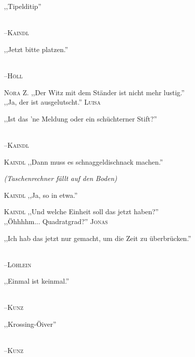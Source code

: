\vspace{3mm}
{\raggedright ,,Tipelditip''}\\
\raggedleft \textsc{\footnotesize --\/Kaindl}\\

\vspace{3mm}
{\raggedright ,,Jetzt bitte platzen.''}\\
\raggedleft \textsc{\footnotesize --\/Höll}\\

\vspace{3mm}
\hangindent=0.7cm
\raggedright \textsc{\footnotesize Nora Z.} ,,Der Witz mit dem Ständer ist nicht mehr lustig.''\\
\raggedleft ,,Ja, der ist ausgelutscht.'' \textsc{\footnotesize Luisa}\\

\vspace{3mm}
{\raggedright ,,Ist das 'ne Meldung oder ein schüchterner Stift?''}\\
\raggedleft \textsc{\footnotesize --\/Kaindl}\\

\vspace{3mm}
\hangindent=0.7cm
\raggedright \textsc{\footnotesize Kaindl} ,,Dann muss es schnaggeldischnack machen.''\\
\raggedright \emph{\footnotesize (Taschenrechner fällt auf den Boden)}\\
\hangindent=0.7cm
\raggedright \textsc{\footnotesize Kaindl} ,,Ja, so in etwa.''\\

\vspace{3mm}
\hangindent=0.7cm
\raggedright \textsc{\footnotesize Kaindl} ,,Und welche Einheit soll das jetzt haben?''\\
\raggedleft ,,Öhhhhm... Quadratgrad?'' \textsc{\footnotesize Jonas}\\

\vspace{3mm}
{\raggedright ,,Ich hab das jetzt nur gemacht, um die Zeit zu überbrücken.''}\\
\raggedleft \textsc{\footnotesize --\/Löhlein}\\

\vspace{3mm}
{\raggedright ,,Einmal ist keinmal.''}\\
\raggedleft \textsc{\footnotesize --\/Kunz}\\

\vspace{3mm}
{\raggedright ,,Krossing-Öiver''}\\
\raggedleft \textsc{\footnotesize --\/Kunz}\\

